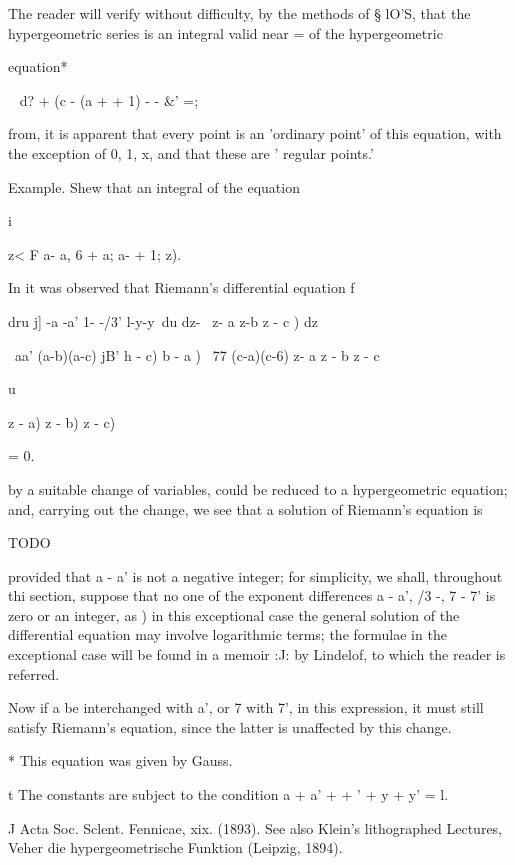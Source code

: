 
The reader will verify without difficulty, by the methods of § lO'S,
that the hypergeometric series is an integral valid near = of the
hypergeometric

equation*

   ~ d? + (c - (a + + 1) - - \&' =;

from, it is apparent that every point is an 'ordinary point' of
this equation, with the exception of 0, 1, x, and that these are '
regular points.'

Example. Shew that an integral of the equation

i

z< F a- a, 6 + a; a- + 1; z).


In it was observed that Riemann's differential equation f

dru j] -a -a' 1- -/3' l-y-y\ du dz- \ z- a z-b z - c ) dz

\ aa' (a-b)(a-c) jB' h - c) b - a ) \ 77 (c-a)(c-6) z- a z - b z - c

u

 z - a) z - b) z - c)

= 0.

by a suitable change of variables, could be reduced to a
hypergeometric equation; and, carrying out the change, we see that a
solution of Riemann's equation is

TODO

provided that a - a' is not a negative integer; for simplicity, we
shall, throughout thi section, suppose that no one of the exponent
differences a - a', /3 -, 7 - 7' is zero or an integer, as )
in this exceptional case the general solution of the differential
equation may involve logarithmic terms; the formulae in the
exceptional case will be found in a memoir :J: by Lindelof, to which
the reader is referred.

Now if a be interchanged with a', or 7 with 7', in this expression, it
must still satisfy Riemann's equation, since the latter is unaffected
by this change.

* This equation was given by Gauss.

t The constants are subject to the condition a + a' + + ' + y + y' =
l.

J Acta Soc. Sclent. Fennicae, xix. (1893). See also Klein's
lithographed Lectures, Veher die hypergeometrische Funktion (Leipzig,
1894).

